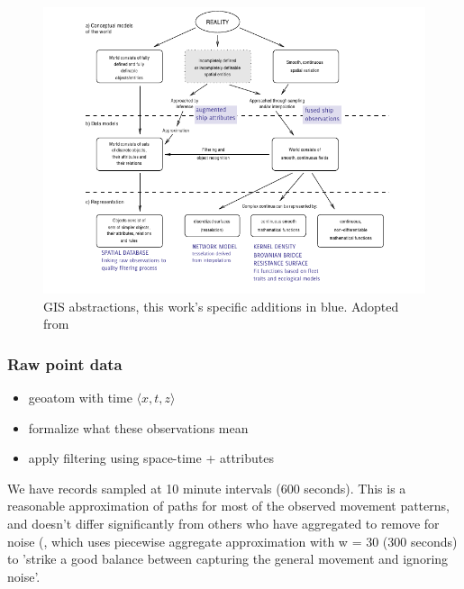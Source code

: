 \begin{figure}[htbp]
  \centering
  \includegraphics[width=160mm]{figures/representation-in-gis.pdf}
  \caption{GIS abstractions, this work's specific {\color{DBlue} additions in blue}. Adopted from \cite{Bivand2011}}
  \label{fig:representation-in-gis}
\end{figure}




\subsubsection{Raw point data}
 \begin{itemize}
   \item geoatom with time $\langle x,t,z \rangle$
   \item formalize what these observations mean
   \item apply filtering using space-time + attributes
 \end{itemize}

We have records sampled at 10 minute intervals (600 seconds). This is a reasonable approximation of paths for most of the observed movement patterns, and doesn't differ significantly from others who have aggregated to remove for noise (\cite{Vries2009}, which uses piecewise aggregate approximation with w = 30 (300 seconds) to 'strike a good balance between capturing the general movement and ignoring noise'. %

